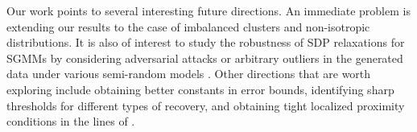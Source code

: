 Our work points to several interesting future directions. An immediate
problem is extending our results to the case of imbalanced clusters
and non-isotropic distributions. It is also of interest to study the
robustness of SDP relaxations for SGMMs by considering adversarial
attacks or arbitrary outliers in the generated data under various
semi-random models \citep{awasthi2017clustering}. Other directions
that are worth exploring include obtaining better constants in error
bounds, identifying sharp thresholds for different types of recovery,
and obtaining tight localized proximity conditions in the lines of
\citet{li2017kmeans}.
